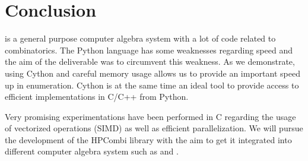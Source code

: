 \documentclass{deliverablereport}
\begin{document}

\section{Conclusion}
\Sage is a general purpose computer algebra system with a lot of code related
to combinatorics. The Python language has some weaknesses regarding speed and the
aim of the deliverable was to circumvent this weakness. As we demonstrate,
using Cython and careful memory usage allows us to provide an
important speed up in enumeration. Cython is at the same time an ideal
tool to provide access to efficient implementations in C/C++ from Python.

Very promising experimentations have been performed in C regarding the usage
of vectorized operations (SIMD) as well as efficient parallelization. We will
pursue the development of the HPCombi library with the aim to get it
integrated into different computer algebra system such as \Sage and \GAP.

\printbibliography
\end{document}

